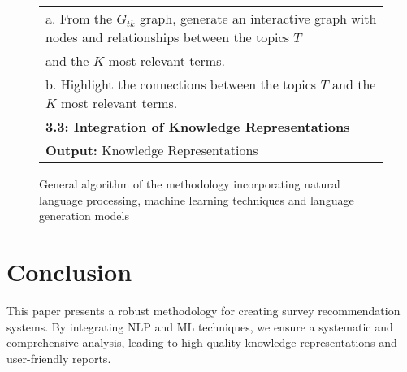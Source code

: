 \documentclass[runningheads]{llncs}
\begin{document}
\begin{figure*}[!h]
{\begin{tabular}{l}
			\quad \quad a. From the $G_{tk}$ graph, generate an interactive graph with nodes and relationships between the topics $T$\\
			\quad \quad and the $K$ most relevant terms.\\
			\quad \quad b. Highlight the connections between the topics $T$ and the $K$ most relevant terms.\\
			\quad \textbf{3.3: Integration of Knowledge Representations}\\
			\hline
			\textbf{Output:} Knowledge Representations \\
			\hline
		\end{tabular}
	}
	\caption{\centering General algorithm of the methodology incorporating natural language processing, machine learning techniques and language generation models}
	\label{tab:Algorithm}
\end{figure*}

\FloatBarrier

\section{Conclusion}
This paper presents a robust methodology for creating survey recommendation systems. By integrating NLP and ML techniques, we ensure a systematic and comprehensive analysis, leading to high-quality knowledge representations and user-friendly reports.
\end{document}
